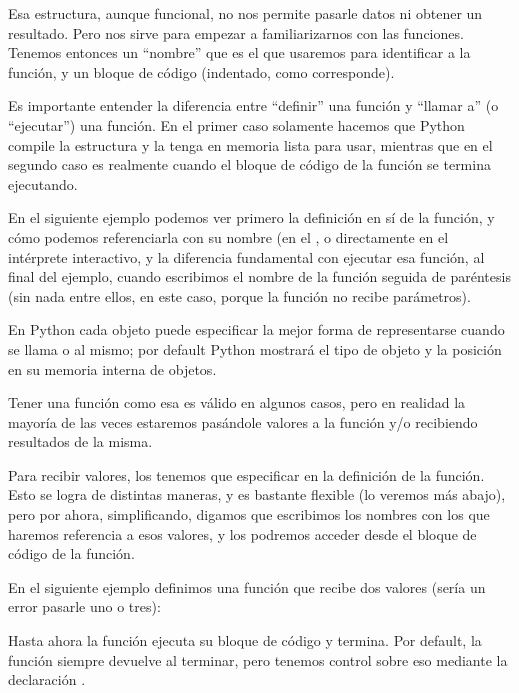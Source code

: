 Esa estructura, aunque funcional, no nos permite pasarle datos ni obtener un resultado. Pero nos sirve para empezar a familiarizarnos con las funciones. Tenemos entonces un ``nombre'' que es el que usaremos para identificar a la función, y un bloque de código (indentado, como corresponde).

Es importante entender la diferencia entre ``definir'' una función y ``llamar a'' (o ``ejecutar'') una función. En el primer caso solamente hacemos que Python compile la estructura y la tenga en memoria lista para usar, mientras que en el segundo caso es realmente cuando el bloque de código de la función se termina ejecutando.

En el siguiente ejemplo podemos ver primero la definición en sí de la función, y cómo podemos referenciarla con su nombre (en el , o directamente en el intérprete interactivo, y la diferencia fundamental con ejecutar esa función, al final del ejemplo, cuando escribimos el nombre de la función seguida de paréntesis (sin nada entre ellos, en este caso, porque la función no recibe parámetros).


\begin{info}
En Python cada objeto puede especificar la mejor forma de representarse cuando se llama  o  al mismo; por default Python mostrará el tipo de objeto y la posición en su memoria interna de objetos.
\end{info}

Tener una función como esa es válido en algunos casos, pero en realidad la mayoría de las veces estaremos pasándole valores a la función y/o recibiendo resultados de la misma.

Para recibir valores, los tenemos que especificar en la definición de la función. Esto se logra de distintas maneras, y es bastante flexible (lo veremos más abajo), pero por ahora, simplificando, digamos que escribimos los nombres con los que haremos referencia a esos valores, y los podremos acceder desde el bloque de código de la función.

En el siguiente ejemplo definimos una función que recibe dos valores (sería un error pasarle uno o tres):


Hasta ahora la función ejecuta su bloque de código y termina. Por default, la función siempre devuelve  al terminar, pero tenemos control sobre eso mediante la declaración .

